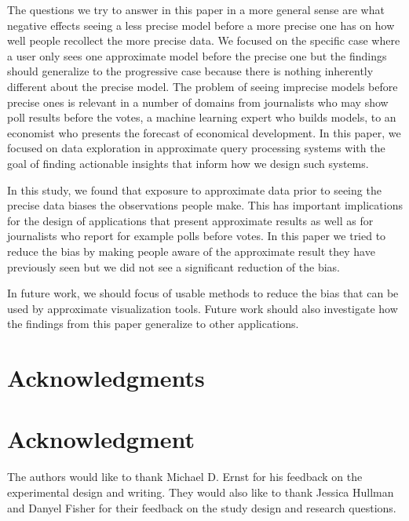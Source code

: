 \documentclass[10pt,journal,compsoc]{IEEEtran}
\begin{document}
The questions we try to answer in this paper in a more general sense are what negative effects seeing a less precise model before a more precise one has on how well people recollect the more precise data.
We focused on the specific case where a user only sees one approximate model before the precise one but the findings should generalize to the progressive case because there is nothing inherently different about the precise model.
The problem of seeing imprecise models before precise ones is relevant in a number of domains from journalists who may show poll results before the votes, a machine learning expert who builds models, to an economist who presents the forecast of economical development.
In this paper, we focused on data exploration in approximate query processing systems with the goal of finding actionable insights that inform how we design such systems.

In this study, we found that exposure to approximate data prior to seeing the precise data biases the observations people make.
This has important implications for the design of applications that present approximate results as well as for journalists who report for example polls before votes.
In this paper we tried to reduce the bias by making people aware of the approximate result they have previously seen but we did not see a significant reduction of the bias.


In future work, we should focus of usable methods to reduce the bias that can be used by approximate visualization tools.
Future work should also investigate how the findings from this paper generalize to other applications.

\ifCLASSOPTIONcompsoc
  \section*{Acknowledgments}
\else
  \section*{Acknowledgment}
\fi


The authors would like to thank Michael D. Ernst for his feedback on the experimental design and writing.
They would also like to thank Jessica Hullman and Danyel Fisher for their feedback on the study design and research questions.

\ifCLASSOPTIONcaptionsoff
  \newpage
\fi
\end{document}

